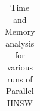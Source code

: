 \documentclass[hidelinks,12pt]{article}
\begin{document}
\begin{table}
\begin{tabular}{|c|c|c|c|c|}
    \hline
  \end{tabular}
  \caption{Time and Memory analysis for various runs of Parallel HNSW}
\end{table}
\end{document}
